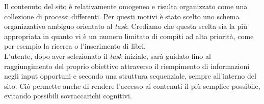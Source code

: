 Il contenuto del sito è relativamente omogeneo e risulta organizzato come una collezione di processi differenti. Per questi motivi è stato scelto uno schema organizzativo ambiguo orientato al \textit{task}. Crediamo che questa scelta sia la più appropriata in quanto vi è un numero limitato di compiti ad alta priorità, come per esempio la ricerca o l'inserimento di libri.\\
L'utente, dopo aver selezionato il \textit{task} iniziale, sarà guidato fino al raggiungimento del proprio obiettivo attraverso il riempimento di informazioni negli input opportuni e secondo una struttura sequenziale, sempre all'interno del sito. Ciò permette anche di rendere l'accesso ai contenuti il più semplice possibile, evitando possibili sovraccarichi cognitivi.